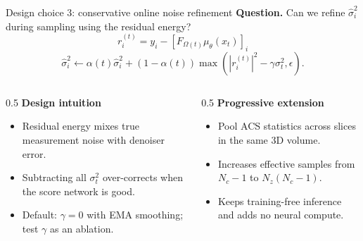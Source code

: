 \documentclass[aspectratio=169]{beamer}
\newcommand{\hatsig}{\hat{\sigma}}
\newcommand{\muth}{\mu_\theta}
\begin{document}
\begin{frame}{Design choice 3: conservative online noise refinement}
  \small
  \textbf{Question.} Can we refine $\hatsig_i^2$ during sampling using the residual energy?
  \[
    r_i^{(t)} = y_i - [F_{\Omega(t)}\muth(x_t)]_i
  \]
  \vspace{-0.3em}
  \[
    \hatsig_i^2 \leftarrow \alpha(t)\hatsig_i^2
    +(1-\alpha(t))\max\left(|r_i^{(t)}|^2-\gamma\sigma_t^2,\epsilon\right).
  \]

  \begin{columns}[T]
    \begin{column}{0.5\textwidth}
      \textbf{Design intuition}
      \begin{itemize}
        \item Residual energy mixes true measurement noise with denoiser error.
        \item Subtracting all $\sigma_t^2$ over-corrects when the score network is good.
        \item Default: $\gamma=0$ with EMA smoothing; test $\gamma$ as an ablation.
      \end{itemize}
    \end{column}
    \begin{column}{0.5\textwidth}
      \textbf{Progressive extension}
      \begin{itemize}
        \item Pool ACS statistics across slices in the same 3D volume.
        \item Increases effective samples from $N_c-1$ to $N_z(N_c-1)$.
        \item Keeps training-free inference and adds no neural compute.
      \end{itemize}
    \end{column}
  \end{columns}
\end{frame}
\end{document}
